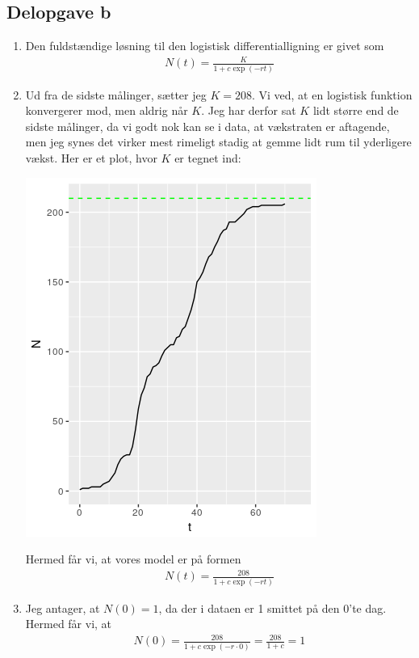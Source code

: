 \documentclass[12pt]{article}
\begin{document}
\subsection{Delopgave b}

\begin{enumerate}
\item Den fuldstændige løsning til den logistisk differentialligning er givet som
\begin{align}
N(t) = \frac{K}{1 + c\exp(-rt)}
\end{align}
\item Ud fra de sidste målinger, sætter jeg $K=208$. Vi ved, at en logistisk funktion konvergerer mod, men aldrig når $K$. Jeg har derfor sat $K$ lidt større end de sidste målinger, da vi godt nok kan se i data, at vækstraten er aftagende, men jeg synes det virker mest rimeligt stadig at gemme lidt rum til yderligere vækst. Her er et plot, hvor $K$ er tegnet ind:
\begin{center}
\includegraphics[scale=0.8]{q2p2.png}
\end{center}
Hermed får vi, at vores model er på formen
\begin{align}
N(t) = \frac{208}{1 + c\exp(-rt)}
\end{align}
\item Jeg antager, at $N(0)=1$, da der i dataen er 1 smittet på den 0'te dag. Hermed får vi, at 
\begin{align}
N(0) = \frac{208}{1 + c\exp(-r\cdot 0)} = \frac{208}{1 + c} = 1

\end{align}
\end{enumerate}
\end{document}
